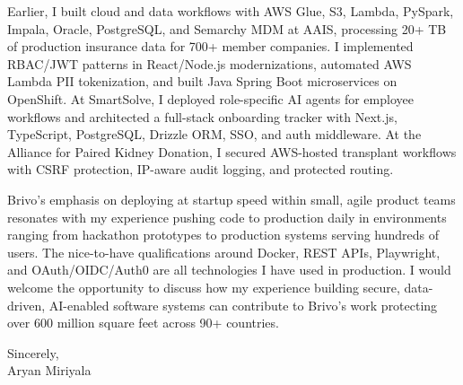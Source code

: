 \documentclass[letterpaper,11pt]{article}
\begin{document}
\vspace{6pt}

Earlier, I built cloud and data workflows with AWS Glue, S3, Lambda, PySpark, Impala, Oracle, PostgreSQL, and Semarchy MDM at AAIS, processing 20+ TB of production insurance data for 700+ member companies. I implemented RBAC/JWT patterns in React/Node.js modernizations, automated AWS Lambda PII tokenization, and built Java Spring Boot microservices on OpenShift. At SmartSolve, I deployed role-specific AI agents for employee workflows and architected a full-stack onboarding tracker with Next.js, TypeScript, PostgreSQL, Drizzle ORM, SSO, and auth middleware. At the Alliance for Paired Kidney Donation, I secured AWS-hosted transplant workflows with CSRF protection, IP-aware audit logging, and protected routing.

\vspace{6pt}

Brivo's emphasis on deploying at startup speed within small, agile product teams resonates with my experience pushing code to production daily in environments ranging from hackathon prototypes to production systems serving hundreds of users. The nice-to-have qualifications around Docker, REST APIs, Playwright, and OAuth/OIDC/Auth0 are all technologies I have used in production. I would welcome the opportunity to discuss how my experience building secure, data-driven, AI-enabled software systems can contribute to Brivo's work protecting over 600 million square feet across 90+ countries.

\vspace{12pt}

Sincerely,\\[6pt]
Aryan Miriyala
\end{document}
